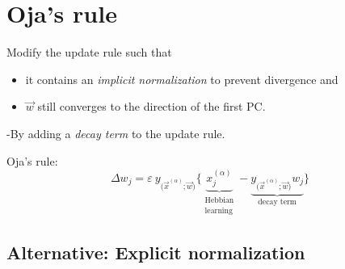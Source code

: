 \section{Oja's rule}


\begin{frame}{\secname}

Modify the update rule such that 
\begin{itemize}
\item it contains an 
\emph{implicit normalization} to prevent divergence and 
\item $\vec w$ still converges to the direction of the first PC.
\end{itemize}


-By adding a \emph{decay term} to the update rule.

\begin{block}{Oja's rule:}
\begin{equation}
	\Delta {w}_j = \varepsilon~y_{ \big( \vec{x}^{(\alpha)}; \vec{w}
		\big) } \bigg\{ 
			\underbrace{ x_j^{(\alpha)} }_{
				\substack{	\text{Hebbian} \\
						\text{learning} }}
			- 
					\underbrace{
	y_{ \big( \vec{x}^{(\alpha)}; \vec{w} \big) } {w}_j
	}_{\text{decay term}}
			\bigg\}
\end{equation}
\end{block}

\end{frame}

\subsection{Alternative: Explicit normalization}

